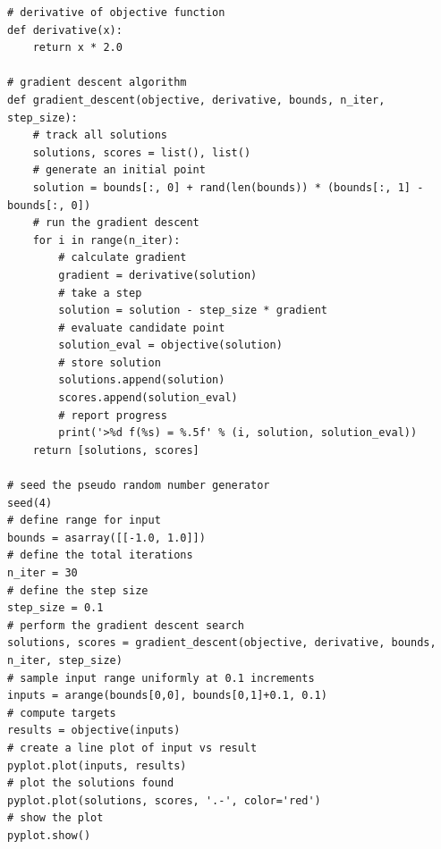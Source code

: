 \documentclass{beamer}
\begin{document}
\begin{frame}
\begin{verbatim}
# derivative of objective function
def derivative(x):
	return x * 2.0
 
# gradient descent algorithm
def gradient_descent(objective, derivative, bounds, n_iter, step_size):
	# track all solutions
	solutions, scores = list(), list()
	# generate an initial point
	solution = bounds[:, 0] + rand(len(bounds)) * (bounds[:, 1] - bounds[:, 0])
	# run the gradient descent
	for i in range(n_iter):
		# calculate gradient
		gradient = derivative(solution)
		# take a step
		solution = solution - step_size * gradient
		# evaluate candidate point
		solution_eval = objective(solution)
		# store solution
		solutions.append(solution)
		scores.append(solution_eval)
		# report progress
		print('>%d f(%s) = %.5f' % (i, solution, solution_eval))
	return [solutions, scores]
 
# seed the pseudo random number generator
seed(4)
# define range for input
bounds = asarray([[-1.0, 1.0]])
# define the total iterations
n_iter = 30
# define the step size
step_size = 0.1
# perform the gradient descent search
solutions, scores = gradient_descent(objective, derivative, bounds, n_iter, step_size)
# sample input range uniformly at 0.1 increments
inputs = arange(bounds[0,0], bounds[0,1]+0.1, 0.1)
# compute targets
results = objective(inputs)
# create a line plot of input vs result
pyplot.plot(inputs, results)
# plot the solutions found
pyplot.plot(solutions, scores, '.-', color='red')
# show the plot
pyplot.show()


\end{verbatim}
\end{frame}
\end{document}

